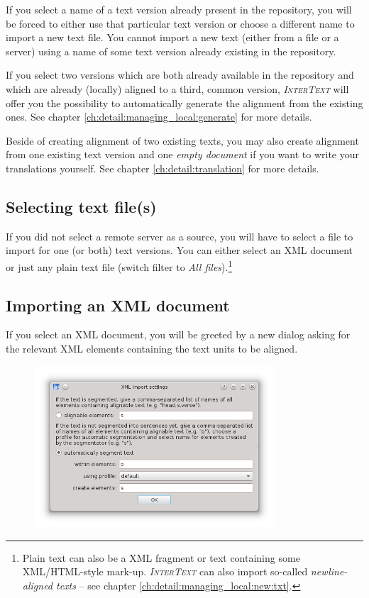 \documentclass[a4paper,10pt,oneside]{book}
\newcommand{\IT}{\textit{\textsc{InterText}}\xspace}
\begin{document}
If you select a name of a text version already present in the repository, you will be forced to either use that particular text version or choose a different name to import a new text file. You cannot import a new text (either from a file or a server) using a name of some text version already existing in the repository.

If you select two versions which are both already available in the repository and which are already (locally) aligned to a third, common version, \IT will offer you the possibility to automatically generate the alignment from the existing ones. See chapter \ref{ch:detail:managing_local:generate} for more details.

Beside of creating alignment of two existing texts, you may also create alignment from one existing text version and one \emph{empty document} if you want to write your translations yourself. See chapter \ref{ch:detail:translation} for more details.

\subsection{Selecting text file(s)}\label{ch:detail:managing_local:new:files}

If you did not select a remote server as a source, you will have to select a file to import for one (or both) text versions. You can either select an XML document or just any plain text file (switch filter to \emph{All files}).\footnote{Plain text can also be a XML fragment or text containing some XML/HTML-style mark-up. \IT can also import so-called \emph{newline-aligned texts} -- see chapter \ref{ch:detail:managing_local:new:txt}.}

\subsection{Importing an XML document}\label{ch:detail:managing_local:new:xml}

If you select an XML document, you will be greeted by a new dialog asking for the relevant XML elements containing the text units to be aligned.

\begin{figure}[htb]
 \includegraphics[width=0.8\textwidth]{screenshots/xml_import.png}
\end{figure}
\end{document}
